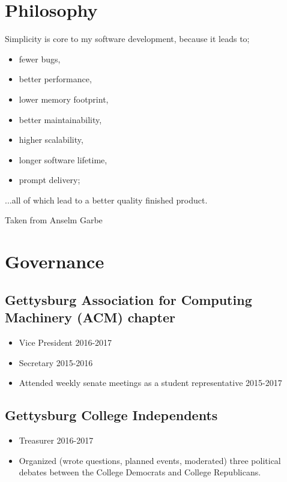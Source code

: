 \documentclass[11pt]{article}
\begin{document}
\section*{Philosophy}
Simplicity is core to my software development, because it leads to;
\begin{itemize}
	\item fewer bugs,
	\item better performance,
	\item lower memory footprint,
	\item better maintainability,
	\item higher scalability,
	\item longer software lifetime, 
	\item prompt delivery; 
\end{itemize}
...all of which lead to a better quality finished product.

Taken from Anselm Garbe 

\section*{Governance}
\subsection*{Gettysburg Association for Computing Machinery (ACM) chapter}
\begin{itemize}
\item Vice President \hfill 2016-2017
\item Secretary \hfill 2015-2016
\item Attended weekly senate meetings as a student representative \hfill 2015-2017
\end{itemize}
 
\subsection*{Gettysburg College Independents}
\begin{itemize}
	\item Treasurer \hfill 2016-2017
    \item Organized (wrote questions, planned events, moderated) three political debates between the College Democrats and College Republicans. 
\end{itemize}
\end{document}
